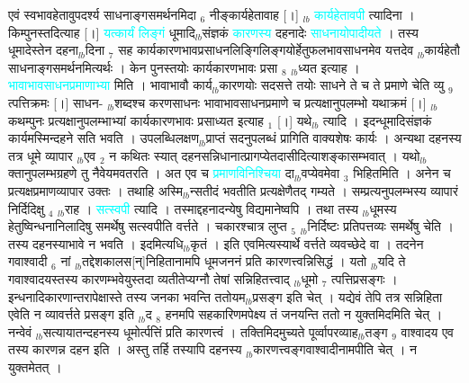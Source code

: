 \documentclass[article,12pt,a4paper]{memoir}%
\newcommand{\quotelemma}[1]{\textcolor{cyan}{#1}}
\begin{document}
	  
	  \pstart \leavevmode%
	एवं स्वभावहेतावुपदर्श्य साधनाङ्गसमर्थनमिदा {\tiny $_{6}$} नीङ्कार्यहेतावाह [।] {\tiny $_{lb}$} \quotelemma{कार्यहेतावपी} \cite[2a2]{vn-msN} त्यादिना । किम्पुनस्तदित्याह [।] \quotelemma{यत्कार्यं लिङ्गं} धूमादि{\tiny $_{lb}$}संज्ञकं \quotelemma{कारणस्य} दहनादेः \quotelemma{साधनायोपादीयते} \cite[2a3]{vn-msN} । तस्य धूमादेस्तेन दहना{\tiny $_{lb}$}दिना {\tiny $_{7}$} सह कार्यकारणभावप्रसाधनलिङ्गिलिङ्गयोर्हेतुफलभावसाधनमेव यत्तदेव {\tiny $_{lb}$}कार्यहेतौ साधनाङ्गसमर्थनमित्यर्थः । केन पुनस्तयोः कार्यकारणभावः प्रसा {\tiny $_{8}$} {\tiny $_{lb}$}ध्यत इत्याह । \quotelemma{भावाभावसाधनप्रमाणाभ्या} \cite[2a3]{vn-msN} मिति । भावाभावौ कार्य{\tiny $_{lb}$}कारणयोः सदसत्ते तयोः साधने ते च ते प्रमाणे चेति व्यु {\tiny $_{9}$} \leavevmode{} त्पत्तिक्रमः [।] साधन- {\tiny $_{lb}$}शब्दश्च करणसाधनः भावाभावसाधनप्रमाणे च प्रत्यक्षानुपलम्भो यथाक्रमं [।] {\tiny $_{lb}$}कथम्पुनः प्रत्यक्षानुपलम्भाभ्यां कार्यकारणभावः प्रसाध्यत इत्याह {\tiny $_{1}$} [।] यथे{\tiny $_{lb}$} \leavevmode{} \cite[2a3]{vn-msN} त्यादि । इदन्धूमादिसंज्ञकं कार्यमस्मिन्दहने सति भवति । उपलब्धिलक्षण{\tiny $_{lb}$}प्राप्तं सदनुपलब्धं प्रागिति वाक्यशेषः कार्यः । अन्यथा दहनस्य तत्र धूमे व्यापार {\tiny $_{lb}$}एव {\tiny $_{2}$} न कथितः स्यात् दहनसन्निधानात्प्रागप्येतदासीदित्याशङ्कासम्भवात् । यथो{\tiny $_{lb}$}क्तानुपलम्भग्रहणे तु नैवेयमवतरति । अत एव च \quotelemma{प्रमाणविनिश्चि\edtext{}{\lemma{विनिश्चि}\Bfootnote{? श्च}}या} दा{\tiny $_{lb}$}वप्येवमेवा {\tiny $_{3}$} भिहितमिति । अनेन च प्रत्यक्षप्रमाणव्यापार उक्तः । तथाहि अस्मि{\tiny $_{lb}$}न्सतीदं भवतीति प्रत्यक्षेणैतद् गम्यते । सम्प्रत्यनुपलम्भस्य व्यापारं निर्दिदिक्षु {\tiny $_{4}$} {\tiny $_{lb}$}राह । \quotelemma{सत्स्वपी} \cite[2a3]{vn-msN} त्यादि । तस्माद्दहनादन्येषु विद्यमानेष्वपि । तथा तस्य {\tiny $_{lb}$}धूमस्य हेतुष्विन्धनानिलादिषु समर्थेषु सत्स्वपीति वर्त्तते । चकारश्चात्र लुप्त {\tiny $_{5}$} {\tiny $_{lb}$}निर्दिष्टः प्रतिपत्तव्यः समर्थेषु चेति । तस्य दहनस्याभावे न भवति । इदमित्यधि{\tiny $_{lb}$}कृतं । इति एवमित्यस्यार्थे वर्त्तते व्यवच्छेदे वा । तदनेन गवाश्वादी {\tiny $_{6}$} नां {\tiny $_{lb}$}तद्देशकालस[न्]निहितानामपि धूमजननं प्रति कारणत्त्वन्निसिद्धं । यतो {\tiny $_{lb}$}यदि ते गवाश्वादयस्तस्य कारणम्भवेयुस्तदा व्यतीतेप्यग्नौ तेषां सन्निहितत्त्वाद् {\tiny $_{lb}$}धूमो {\tiny $_{7}$} त्पत्तिप्रसङ्गः । इन्धनादिकारणान्तरापेक्षास्ते तस्य जनका भवन्ति ततोयम{\tiny $_{lb}$}प्रसङ्ग इति चेत् । यद्येवं तेपि तत्र सन्निहिता एवेति न व्यावर्त्तते प्रसङ्ग इति {\tiny $_{lb}$}द {\tiny $_{8}$} हनमपि सहकारिणमपेक्ष्य तं जनयन्ति ततो न युक्तमिदमिति चेत् । नन्वेवं {\tiny $_{lb}$}सत्यायातन्दहनस्य धूमोर्त्पत्तिं प्रति कारणत्त्वं । तक्तिमिदमुच्यते पूर्व्वापरव्याह{\tiny $_{lb}$}तङ्ग {\tiny $_{9}$} \leavevmode{} वाश्वादय एव तस्य कारणन्न दहन इति । अस्तु तर्हि तस्यापि दहनस्य {\tiny $_{lb}$}कारणत्त्वङ्गवाश्वादीनामपीति चेत् । न युक्तमेतत् । 
\end{document}
